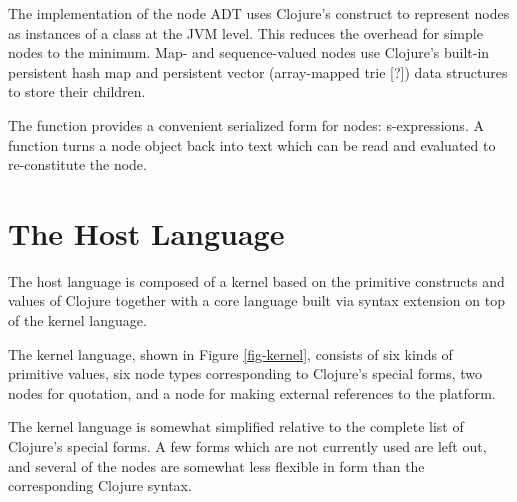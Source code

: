 The implementation of the node ADT uses Clojure's  construct to represent nodes as instances of a  class at the JVM level. This reduces the overhead for simple nodes to the minimum. Map- and sequence-valued nodes use Clojure's built-in persistent hash map and persistent vector (array-mapped trie [?]) data structures to store their children.

The  function provides a convenient serialized form for nodes: s-expressions. A  function turns a node object back into text which can be read and evaluated to re-constitute the node.


\section{The Host Language}
\label{host}
The host language is composed of a kernel based on the primitive constructs and values of Clojure together with a core language built via syntax extension on top of the kernel language.

The kernel language, shown in Figure \ref{fig-kernel}, consists of six kinds of primitive values, six node types corresponding to Clojure's special forms, two nodes for quotation, and a node for making external references to the platform.

The kernel language is somewhat simplified relative to the complete list of Clojure's special forms. A few forms which are not currently used are left out, and several of the nodes are somewhat less flexible in form than the corresponding Clojure syntax.

